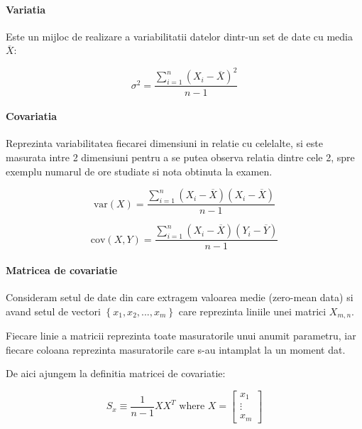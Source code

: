 \documentclass[12pt,oneside]{article}
\begin{document}
\paragraph{Variatia} Este un mijloc de realizare a variabilitatii datelor dintr-un set de date cu media $\overline{X}$:

\begin{equation}
\sigma^2=\frac{\sum_{i=1}^{n} \left( X_i - \overline{X} \right)^2 }{n-1}
\end{equation}

\paragraph{Covariatia} Reprezinta variabilitatea fiecarei dimensiuni in relatie cu celelalte, si este masurata intre 2 dimensiuni pentru a se putea observa relatia dintre cele 2, spre exemplu numarul de ore studiate si nota obtinuta la examen.

\begin{equation}
\text {var} \left( X \right) = \frac{\sum_{i=1}^{n} \left( X_i - \overline{X} \right) \left( X_i - \overline{X} \right) }{n-1}
\end{equation}


\begin{equation}
\text {cov} \left( X,Y \right) = \frac{\sum_{i=1}^{n} \left( X_i - \overline{X} \right) \left( Y_i - \overline{Y} \right) }{n-1}
\end{equation}


\paragraph{Matricea de covariatie}
Consideram setul de date din care extragem valoarea medie (zero-mean data) si avand setul de vectori \( \left\{ x_1, x_2, ..., x_m \right\} \) care reprezinta liniile unei matrici $X_{m,n}$.

Fiecare linie a matricii reprezinta toate masuratorile unui anumit parametru, iar fiecare coloana reprezinta masuratorile care s-au intamplat la un moment dat.

De aici ajungem la definitia matricei de covariatie:

\begin{equation}
S_x \equiv \frac{1}{n-1}XX^T \text { where } X = 
\begin{bmatrix}
x_1 \\ \vdots \\ x_m
\end{bmatrix}
\end{equation}
\end{document}
